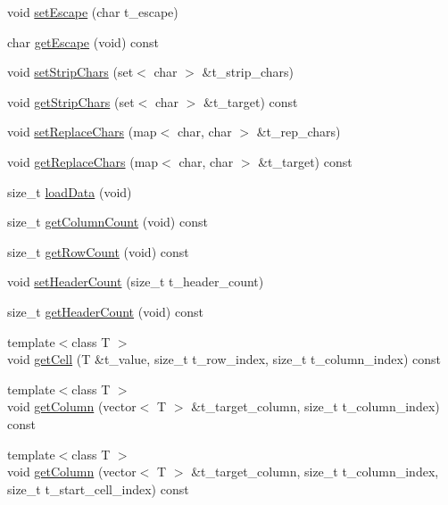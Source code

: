 \begin{DoxyCompactItemize}
void \hyperlink{classutils_1_1SlightCSV_a6673b7489c55fe9613f0ebd5dce19da4}{set\+Escape} (char t\+\_\+escape)
\item 
char \hyperlink{classutils_1_1SlightCSV_ab821a07daafa1ccaf8468ac485b226b0}{get\+Escape} (void) const
\item 
void \hyperlink{classutils_1_1SlightCSV_a8a1d201855747b4c1207ecef5ac1e2b5}{set\+Strip\+Chars} (set$<$ char $>$ \&t\+\_\+strip\+\_\+chars)
\item 
void \hyperlink{classutils_1_1SlightCSV_a13d435b5e07c827f6688efa9bf4673d4}{get\+Strip\+Chars} (set$<$ char $>$ \&t\+\_\+target) const
\item 
void \hyperlink{classutils_1_1SlightCSV_a9f7c4e3d88da03440d01b926b1fc3447}{set\+Replace\+Chars} (map$<$ char, char $>$ \&t\+\_\+rep\+\_\+chars)
\item 
void \hyperlink{classutils_1_1SlightCSV_aa28076f9867ef095802adbe0d8f966fb}{get\+Replace\+Chars} (map$<$ char, char $>$ \&t\+\_\+target) const
\item 
size\+\_\+t \hyperlink{classutils_1_1SlightCSV_adea079ec76c9ee67d096f8fd39946380}{load\+Data} (void)
\item 
size\+\_\+t \hyperlink{classutils_1_1SlightCSV_a5dcd159ef127b63942bce5498beb8dae}{get\+Column\+Count} (void) const
\item 
size\+\_\+t \hyperlink{classutils_1_1SlightCSV_a5286060190553fe7eceb973bba22ae22}{get\+Row\+Count} (void) const
\item 
void \hyperlink{classutils_1_1SlightCSV_a3d704d8bbce22b1731e383db4fc96429}{set\+Header\+Count} (size\+\_\+t t\+\_\+header\+\_\+count)
\item 
size\+\_\+t \hyperlink{classutils_1_1SlightCSV_a781ae99927f2b8d704add6a2a53e0051}{get\+Header\+Count} (void) const
\item 
{\footnotesize template$<$class T $>$ }\\void \hyperlink{classutils_1_1SlightCSV_a4408a8e8d32a579a0f5e33a1083e7fb8}{get\+Cell} (T \&t\+\_\+value, size\+\_\+t t\+\_\+row\+\_\+index, size\+\_\+t t\+\_\+column\+\_\+index) const
\item 
{\footnotesize template$<$class T $>$ }\\void \hyperlink{classutils_1_1SlightCSV_a56b9814d42283eb075bcfe3a9ca887e7}{get\+Column} (vector$<$ T $>$ \&t\+\_\+target\+\_\+column, size\+\_\+t t\+\_\+column\+\_\+index) const
\item 
{\footnotesize template$<$class T $>$ }\\void \hyperlink{classutils_1_1SlightCSV_a31db986196c89fa8b5b4f119fe548b0b}{get\+Column} (vector$<$ T $>$ \&t\+\_\+target\+\_\+column, size\+\_\+t t\+\_\+column\+\_\+index, size\+\_\+t t\+\_\+start\+\_\+cell\+\_\+index) const

\end{DoxyCompactItemize}
